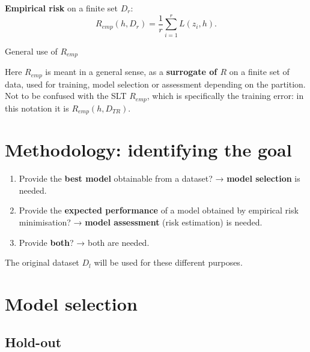 \textbf{Empirical risk} on a finite set \(D_r\): \[
R_{emp}(h, D_r) = \frac{1}{r}\sum_{i=1}^{r} L(z_i, h).
\]

\begin{boxwarning}{General use of \(R_{emp}\)}

Here \(R_{emp}\) is meant in a general sense, as a \textbf{surrogate of
\(R\)} on a finite set of data, used for training, model selection or
assessment depending on the partition. Not to be confused with the SLT
\(R_{emp}\), which is specifically the training error: in this notation
it is \(R_{emp}(h, D_{TR})\).

\end{boxwarning}

\section{Methodology: identifying the
goal}\label{metodologia-identificare-lobiettivo}

\begin{enumerate}
\def\labelenumi{\arabic{enumi}.}
\tightlist
\item
  Provide the \textbf{best model} obtainable from a dataset? →
  \textbf{model selection} is needed.
\item
  Provide the \textbf{expected performance} of a model obtained by
  empirical risk minimisation? → \textbf{model assessment} (risk
  estimation) is needed.
\item
  Provide \textbf{both}? → both are needed.
\end{enumerate}

The original dataset \(D_l\) will be used for these different purposes.

\section{Model selection}\label{model-selection}

\subsection{Hold-out}\label{hold-out}

